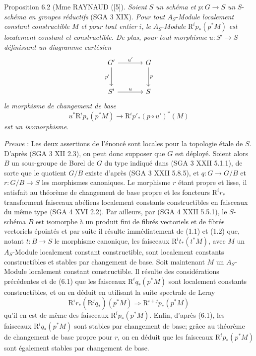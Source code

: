 \begin{statement}{Proposition 6.2}
(Mme RAYNAUD ([5]). \emph{Soient} $S$ \emph{un schéma et} $p:G\to S$ \emph{un} $S$-\emph{schéma en groupes réductifs} (SGA 3 XIX). \emph{Pour tout} $A_S$-\emph{Module localement constant constructible} $M$ \emph{et pour tout entier} $i$, \emph{le} $A_S$-\emph{Module} $\mathrm{R}^ip_*(p^*M)$ \emph{est localement constant et constructible. De plus, pour tout morphisme} $u:S'\to S$ \emph{définissant un diagramme cartésien}
\[
\begin{tikzcd}[column sep=large,row sep=large]
G' \arrow[r,"u'"] \arrow[d,"p'"'] & G \arrow[d,"p"]\\
S' \arrow[r,"u"] & S
\end{tikzcd}
\]
\emph{le morphisme de changement de base}
\[
u^*\mathrm{R}^ip_*(p^*M)\to \mathrm{R}^ip'_*(p\circ u')^*(M)
\]
\emph{est un isomorphisme}.
\end{statement}

\emph{Preuve} : Les deux assertions de l'énoncé sont locales pour la topologie étale de $S$. D'après (SGA 3 XII 2.3), on peut donc supposer que $G$ est déployé. Soient alors $B$ un sous-groupe de Borel de $G$ du type indiqué dans (SGA 3 XXII 5.1.1), de sorte que le quotient $G/B$ existe d'après (SGA 3 XXII 5.8.5), et $q:G\to G/B$ et $r:G/B\to S$ les morphismes canoniques. Le morphisme $r$ étant propre et lisse, il satisfait au théorème de changement de base propre et les foncteurs $\mathrm{R}^ir_*$ transforment faisceaux abéliens localement constants constructibles en faisceaux du même type (SGA 4 XVI 2.2). Par ailleurs, par (SGA 4 XXII 5.5.1), le $S$-schéma $B$ est isomorphe à un produit fini de fibrés vectoriels et de fibrés vectoriels épointés et par
suite il résulte immédiatement de (1.1) et (1.2) que, notant $t:B\to S$ le morphisme canonique, les 
faisceaux $\mathrm{R}^it_*(t^*M)$, avec $M$ un $A_S$-Module localement constant constructible, sont localement constants constructibles et stables par changement de base. Soit maintenant $M$ un $A_S$-Module localement constant constructible. Il résulte des considérations précédentes et de (6.1) que les faisceaux $\mathrm{R}^iq_*(p^*M)$ sont localement constants constructibles, et on en déduit en utilisant la suite spectrale de Leray
\[
\mathrm{R}^ir_*(\mathrm{R}^jq_*)(p^*M)\Rightarrow \mathrm{R}^{i+j}p_*(p^*M)
\]
qu'il en est de même des faisceaux $\mathrm{R}^ip_*(p^*M)$. Enfin, d'après (6.1), les faisceaux $\mathrm{R}^iq_*(p^*M)$ sont stables par changement de base; grâce au théorème de changement de base propre pour $r$, on en déduit que les faisceaux $\mathrm{R}^ip_*(p^*M)$ sont également stables par changement de base.

